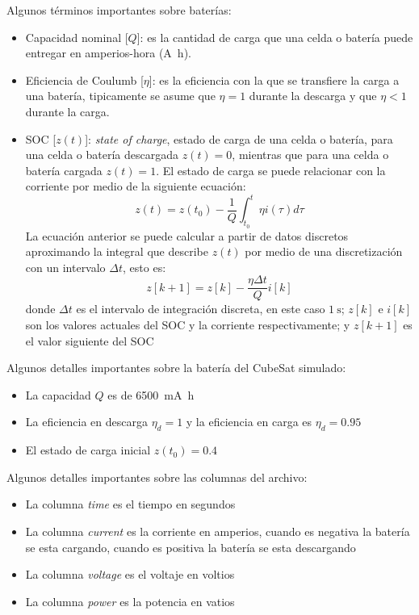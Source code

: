 \documentclass[12pt]{article}
\begin{document}
Algunos términos importantes sobre baterías:
\begin{itemize}
    \item Capacidad nominal [$Q$]: es la cantidad de carga que una celda o batería puede entregar en amperios-hora (\si{\ampere\hour}).
    \item Eficiencia de Coulumb [$\eta$]: es la eficiencia con la que se transfiere la carga a una batería, tipicamente se asume que $\eta = 1$ durante la descarga y que $\eta < 1$ durante la carga. 
    \item SOC [$z(t)$]: \emph{state of charge}, estado de carga de una celda o batería, para una celda o batería descargada $z(t) = 0$, mientras que para una celda o batería cargada $z(t) = 1$. El estado de carga se puede relacionar con la corriente por medio de la siguiente ecuación:
        \begin{equation*}
            z(t) = z(t_0) - \dfrac{1}{Q}\int_{t_0}^t \eta i(\tau) d\tau
        \end{equation*}
    La ecuación anterior se puede calcular a partir de datos discretos aproximando la integral que describe $z(t)$ por medio de una discretización con un intervalo $\Delta t$, esto es: 
        \begin{equation*}
            z[k+1] = z[k] - \dfrac{\eta \Delta t}{Q}i[k]
        \end{equation*}
    donde $\Delta t$ es el intervalo de integración discreta, en este caso $\SI{1}{\second}$; $z[k]$ e $i[k]$ son los valores actuales del SOC y la corriente respectivamente; y $z[k+1]$ es el valor siguiente del SOC
\end{itemize}

Algunos detalles importantes sobre la batería del CubeSat simulado:
\begin{itemize}
    \item La capacidad $Q$ es de \SI{6500}{\milli\ampere\hour}
    \item La eficiencia en descarga $\eta_d = 1$ y la eficiencia en carga es $\eta_d = 0.95$
    \item El estado de carga inicial $z(t_0)=0.4$ 
\end{itemize}

Algunos detalles importantes sobre las columnas del archivo:
\begin{itemize}
    \item La columna \emph{time} es el tiempo en segundos
    \item La columna \emph{current} es la corriente en amperios, cuando es negativa la batería se esta cargando, cuando es positiva la batería se esta descargando
    \item La columna \emph{voltage} es el voltaje en voltios
    \item La columna \emph{power} es la potencia en vatios
\end{itemize}
\end{document}
